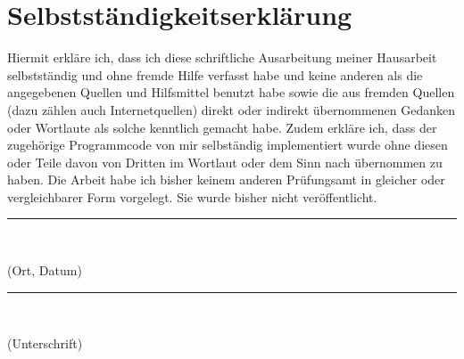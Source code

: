 \section*{Selbstständigkeitserklärung}

Hiermit erkläre ich, dass ich diese schriftliche Ausarbeitung meiner Hausarbeit selbstständig und ohne fremde Hilfe verfasst habe und keine anderen als die angegebenen Quellen und Hilfsmittel benutzt habe sowie die aus fremden Quellen (dazu zählen auch Internetquellen) direkt oder indirekt übernommenen Gedanken oder Wortlaute als solche kenntlich gemacht habe. Zudem erkläre ich, dass der zugehörige Programmcode von mir selbständig implementiert wurde ohne diesen oder Teile davon von Dritten im Wortlaut oder dem Sinn nach übernommen zu haben. Die Arbeit habe ich bisher keinem anderen Prüfungsamt in gleicher oder vergleichbarer Form vorgelegt. Sie wurde bisher nicht veröffentlicht.\\

\vspace{1cm}
\parbox{4cm}{%
\rule{4cm}{0.5pt}\\
\centerline{(Ort, Datum)}%
}\hfill
\parbox{5cm}{%
\rule{5cm}{0.5pt}\\
\centerline{(Unterschrift)}%
}